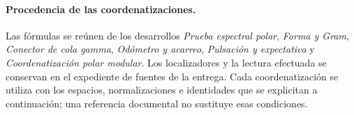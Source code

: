 \paragraph{Procedencia de las coordenatizaciones.}
Las fórmulas se reúnen de los desarrollos \emph{Prueba espectral polar},
\emph{Forma y Gram}, \emph{Conector de cola gamma}, \emph{Odómetro y
acarreo}, \emph{Pulsación y expectativa} y \emph{Coordenatización polar modular}.
Los localizadores y la lectura efectuada se conservan en el expediente de
fuentes de la entrega. Cada coordenatización se utiliza con los espacios,
normalizaciones e identidades que se explicitan a continuación; una
referencia documental no sustituye esas condiciones.

